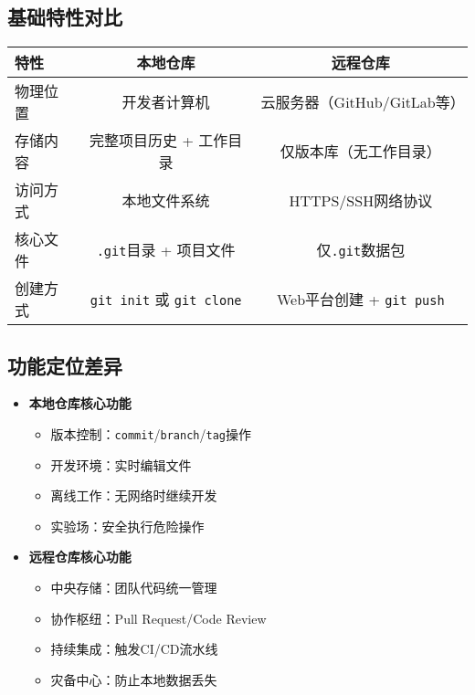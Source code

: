 \subsection{基础特性对比}
\begin{center}
\begin{tabular}{lcc}
    \toprule
    \textbf{特性} & \textbf{本地仓库} & \textbf{远程仓库} \\
    \midrule
    物理位置 & 开发者计算机 & 云服务器（GitHub/GitLab等） \\
    存储内容 & 完整项目历史 + 工作目录 & 仅版本库（无工作目录） \\
    访问方式 & 本地文件系统 & HTTPS/SSH网络协议 \\
    核心文件 & \texttt{.git}目录 + 项目文件 & 仅\texttt{.git}数据包 \\
    创建方式 & \texttt{git init} 或 \texttt{git clone} & Web平台创建 + \texttt{git push} \\
    \bottomrule
\end{tabular}
\end{center}

\subsection{功能定位差异}
\begin{itemize}[leftmargin=*, nosep]
    \item \textbf{本地仓库核心功能}
    \begin{itemize}
        \item 版本控制：\texttt{commit}/\texttt{branch}/\texttt{tag}操作
        \item 开发环境：实时编辑文件
        \item 离线工作：无网络时继续开发
        \item 实验场：安全执行危险操作
    \end{itemize}
    
    \item \textbf{远程仓库核心功能}
    
\begin{itemize}
        \item 中央存储：团队代码统一管理
        \item 协作枢纽：Pull Request/Code Review
        \item 持续集成：触发CI/CD流水线
        \item 灾备中心：防止本地数据丢失
    \end{itemize}
\end{itemize}

